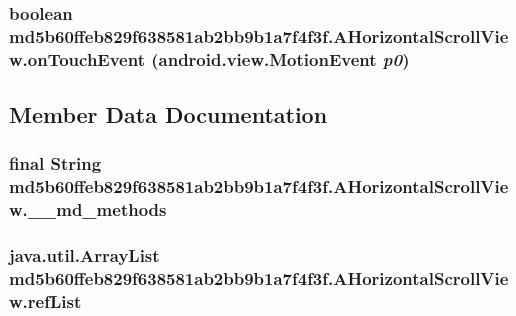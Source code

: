 \hypertarget{classmd5b60ffeb829f638581ab2bb9b1a7f4f3f_1_1_a_horizontal_scroll_view_a8fe4de3af4981fca3ea1efa4d423798}{
\subsubsection[{onTouchEvent}]{\setlength{\rightskip}{0pt plus 5cm}boolean md5b60ffeb829f638581ab2bb9b1a7f4f3f.AHorizontalScrollView.onTouchEvent (android.view.MotionEvent {\em p0})}}
\label{classmd5b60ffeb829f638581ab2bb9b1a7f4f3f_1_1_a_horizontal_scroll_view_a8fe4de3af4981fca3ea1efa4d423798}




\subsection{Member Data Documentation}
\hypertarget{classmd5b60ffeb829f638581ab2bb9b1a7f4f3f_1_1_a_horizontal_scroll_view_49c664fbcff063e605248e4205b9125b}{
\subsubsection[{\_\-\_\-md\_\-methods}]{\setlength{\rightskip}{0pt plus 5cm}final String {\bf md5b60ffeb829f638581ab2bb9b1a7f4f3f.AHorizontalScrollView.\_\-\_\-md\_\-methods}}}
\label{classmd5b60ffeb829f638581ab2bb9b1a7f4f3f_1_1_a_horizontal_scroll_view_49c664fbcff063e605248e4205b9125b}


\hypertarget{classmd5b60ffeb829f638581ab2bb9b1a7f4f3f_1_1_a_horizontal_scroll_view_ceed0b3ec50f57c238e9674fd57c3c26}{
\subsubsection[{refList}]{\setlength{\rightskip}{0pt plus 5cm}java.util.ArrayList {\bf md5b60ffeb829f638581ab2bb9b1a7f4f3f.AHorizontalScrollView.refList}}}
\label{classmd5b60ffeb829f638581ab2bb9b1a7f4f3f_1_1_a_horizontal_scroll_view_ceed0b3ec50f57c238e9674fd57c3c26}




